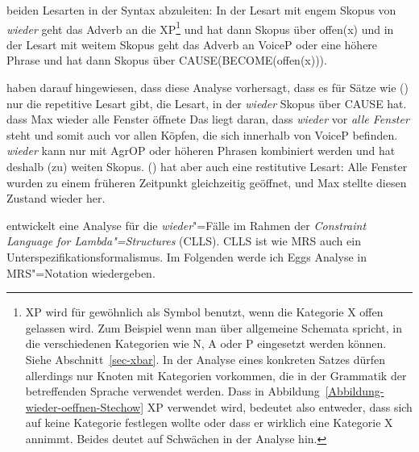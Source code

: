 beiden Lesarten in der Syntax abzuleiten: In der Lesart mit engem Skopus von \emph{wieder} geht das
Adverb an die XP\footnote{%
  XP wird für gewöhnlich als Symbol benutzt, wenn die Kategorie X offen gelassen wird. Zum Beispiel
  wenn man über allgemeine Schemata spricht, in die verschiedenen Kategorien wie N, A oder P
  eingesetzt werden können. Siehe Abschnitt~\ref{sec-xbar}. In der Analyse eines konkreten Satzes
  dürfen allerdings nur Knoten mit Kategorien vorkommen, die in der Grammatik der betreffenden
  Sprache verwendet werden. Dass in Abbildung~\ref{Abbildung-wieder-oeffnen-Stechow} XP verwendet
  wird, bedeutet also entweder, dass \citeauthor{Stechow96a} sich auf keine Kategorie festlegen
  wollte oder dass er wirklich eine Kategorie X annimmt. Beides deutet auf Schwächen in der Analyse hin.
} und hat dann Skopus über offen(x) und in der Lesart mit weitem Skopus geht
das Adverb an VoiceP oder eine höhere Phrase und hat dann Skopus über CAUSE(BECOME(offen(x))).

\citet{JB2003a-u} haben darauf hingewiesen, dass diese Analyse vorhersagt, dass es für Sätze wie
() nur die repetitive Lesart gibt, \dash die Lesart, in der \emph{wieder} Skopus über CAUSE hat.
\ea
\label{ex-wieder-alle}
dass Max wieder alle Fenster öffnete
\z
Das liegt daran, dass \emph{wieder} vor \emph{alle Fenster} steht und somit auch vor allen Köpfen,
die sich innerhalb von VoiceP befinden. \emph{wieder} kann nur mit AgrOP oder höheren Phrasen
kombiniert werden und hat deshalb (zu) weiten Skopus. () hat aber auch eine restitutive
Lesart: Alle Fenster wurden zu einem früheren Zeitpunkt gleichzeitig geöffnet, und Max stellte
diesen Zustand wieder her.


\citet{Egg99a} entwickelt eine Analyse für die \emph{wieder}"=Fälle im Rahmen der \emph{Constraint
  Language for Lambda"=Structures} (CLLS). CLLS ist wie MRS auch ein
  Unterspezifikationsformalismus. Im Folgenden werde ich Eggs Analyse in MRS"=Notation
  wiedergeben.

